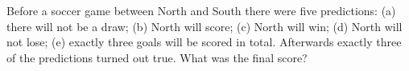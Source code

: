 Before a soccer game between North and South there were five predictions: (a) there will not be a draw; (b) North will score; (c) North will win; (d) North will not lose; (e) exactly three goals will be scored in total. Afterwards exactly three of the predictions turned out true. What was the final score?
